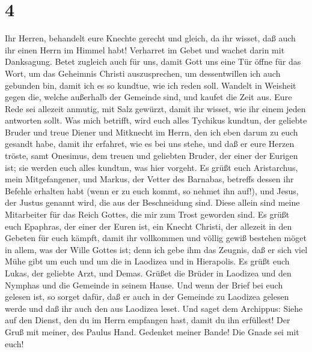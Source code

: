 \hypertarget{section-3}{%
\section{4}\label{section-3}}

 Ihr Herren, behandelt eure Knechte gerecht und gleich, da
ihr wisset, daß auch ihr einen Herrn im Himmel habt! 
Verharret im Gebet und wachet darin mit Danksagung.  Betet
zugleich auch für uns, damit Gott uns eine Tür öffne für das Wort, um
das Geheimnis Christi auszusprechen, um dessentwillen ich auch gebunden
bin,  damit ich es so kundtue, wie ich reden soll.
 Wandelt in Weisheit gegen die, welche außerhalb der
Gemeinde sind, und kaufet die Zeit aus.  Eure Rede sei
allezeit anmutig, mit Salz gewürzt, damit ihr wisset, wie ihr einem
jeden antworten sollt.  Was mich betrifft, wird euch alles
Tychikus kundtun, der geliebte Bruder und treue Diener und Mitknecht im
Herrn,  den ich eben darum zu euch gesandt habe, damit ihr
erfahret, wie es bei uns stehe, und daß er eure Herzen tröste,
 samt Onesimus, dem treuen und geliebten Bruder, der einer
der Eurigen ist; sie werden euch alles kundtun, was hier vorgeht.
 Es grüßt euch Aristarchus, mein Mitgefangener, und
Markus, der Vetter des Barnabas, betreffs dessen ihr Befehle erhalten
habt (wenn er zu euch kommt, so nehmet ihn auf!),  und
Jesus, der Justus genannt wird, die aus der Beschneidung sind. Diese
allein sind meine Mitarbeiter für das Reich Gottes, die mir zum Trost
geworden sind.  Es grüßt euch Epaphras, der einer der
Euren ist, ein Knecht Christi, der allezeit in den Gebeten für euch
kämpft, damit ihr vollkommen und völlig gewiß bestehen möget in allem,
was der Wille Gottes ist;  denn ich gebe ihm das Zeugnis,
daß er sich viel Mühe gibt um euch und um die in Laodizea und in
Hierapolis.  Es grüßt euch Lukas, der geliebte Arzt, und
Demas.  Grüßet die Brüder in Laodizea und den Nymphas und
die Gemeinde in seinem Hause.  Und wenn der Brief bei
euch gelesen ist, so sorget dafür, daß er auch in der Gemeinde zu
Laodizea gelesen werde und daß ihr auch den aus Laodizea leset.
 Und saget dem Archippus: Siehe auf den Dienst, den du im
Herrn empfangen hast, damit du ihn erfüllest!  Der Gruß
mit meiner, des Paulus Hand. Gedenket meiner Bande! Die Gnade sei mit
euch!
